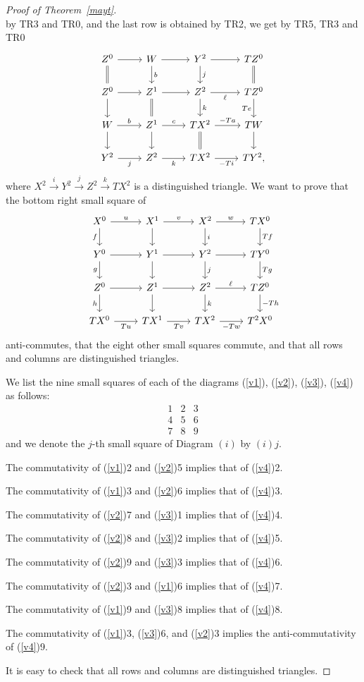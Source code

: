 \documentclass[12pt]{article}
\theoremstyle{remark}
\theoremstyle{definition}
\begin{document}
\begin{proof}[Proof of Theorem~\ref{mayt}]
$$$$
by TR3 and TR0, and the last row is obtained by TR2, we get by TR5, TR3 and TR0
%
\begin{equation}\label{v3}
\begin{tikzcd}
Z^0\ar{r}\ar[equal]{d}&W\ar{d}{b}\ar{r}&Y^2\ar{d}{j}\ar{r}&TZ^0\ar[equal]{d}\\
Z^0\ar{d}\ar{r}&Z^1\ar{r}\ar[equal]{d}&Z^2\ar{d}{k}\ar{r}[swap]{\ell}&TZ^0\ar{d}[swap]{Te}\\
W\ar{d}\ar{r}{b}&Z^1\ar{d}\ar{r}{c}&TX^2\ar{r}{-Ta}\ar[equal]{d}&TW\ar{d}\\
Y^2\ar{r}[swap]{j}&Z^2\ar{r}[swap]{k}&TX^2\ar{r}[swap]{-Ti}&TY^2,
\end{tikzcd}
\end{equation}
%
where $X^2\overset{i}{\to}Y^2\overset{j}{\to}Z^2\overset{k}{\to}TX^2$ is a distinguished triangle. We want to prove that the bottom right small square of 
%
\begin{equation}\label{v4}
\begin{tikzcd}
X^0\ar{r}{u}\ar{d}[swap]{f}&X^1\ar{d}\ar{r}{v}&X^2\ar{d}{i}\ar{r}{w}&TX^0\ar{d}{Tf}\\ 
Y^0\ar{r}\ar{d}[swap]{g}&Y^1\ar{d}\ar{r}&Y^2\ar{d}{j}\ar{r}&TY^0\ar{d}{Tg}\\ 
Z^0\ar{r}\ar{d}[swap]{h}&Z^1\ar{d}\ar{r}&Z^2\ar{d}{k}\ar{r}{\ell}&TZ^0\ar{d}{-Th}\\ 
TX^0\ar{r}[swap]{Tu}&TX^1\ar{r}[swap]{Tv}&TX^2\ar{r}[swap]{-Tw}&T^2X^0
\end{tikzcd}
\end{equation}
%
anti-commutes, that the eight other small squares commute, and that all rows and columns are distinguished triangles.

We list the nine small squares of each of the diagrams (\ref{v1}), (\ref{v2}), (\ref{v3}), (\ref{v4}) as follows:
$$
\begin{matrix}1&2&3\\ 4&5&6\\ 7&8&9
\end{matrix}
$$ 
and we denote the $j$-th small square of Diagram $(i)$ by $(i)j$. 

The commutativity of (\ref{v1})2 and (\ref{v2})5 implies that of (\ref{v4})2. 

The commutativity of (\ref{v1})3 and (\ref{v2})6 implies that of (\ref{v4})3.

The commutativity of (\ref{v2})7 and (\ref{v3})1 implies that of (\ref{v4})4.

The commutativity of (\ref{v2})8 and (\ref{v3})2 implies that of (\ref{v4})5. 

The commutativity of (\ref{v2})9 and (\ref{v3})3 implies that of (\ref{v4})6. 

The commutativity of (\ref{v2})3 and (\ref{v1})6 implies that of (\ref{v4})7. 

The commutativity of (\ref{v1})9 and (\ref{v3})8 implies that of (\ref{v4})8. 

The commutativity of (\ref{v1})3, (\ref{v3})6, and (\ref{v2})3 implies the anti-commutativity of (\ref{v4})9. 

It is easy to check that all rows and columns are distinguished triangles.
%
\end{proof}
%
%
\end{document}
